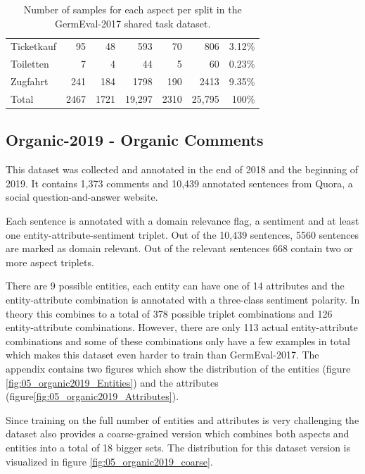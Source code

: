 \begin{table}
\begin{tabular}{lrrrrrr}
		Ticketkauf                   & 95     & 48     & 593    & 70   & 806    & 3.12\%  \\
		Toiletten                    & 7      & 4      & 44     & 5    & 60     & 0.23\%  \\
		Zugfahrt                     & 241    & 184    & 1798   & 190  & 2413   & 9.35\%  \\ 
		\midrule
		Total                        & 2467   & 1721   & 19,297 & 2310 & 25,795 & 100\%   \\ 
		\bottomrule
	\end{tabular}
	\caption{Number of samples for each aspect per split in the GermEval-2017 shared task dataset.}
\label{tab:05_germevalDatasetStats}
\end{table}

\subsection{Organic-2019 - Organic Comments}
\label{sec:05_organic2019}
This dataset was collected and annotated in the end of 2018 and the beginning of 2019. It contains 1,373 comments and 10,439 annotated sentences from Quora, a social question-and-answer website.
\medskip

Each sentence is annotated with a domain relevance flag, a sentiment and at least one entity-attribute-sentiment triplet. Out of the 10,439 sentences, 5560 sentences are marked as domain relevant. Out of the relevant sentences 668 contain two or more aspect triplets.
\medskip

There are 9 possible entities, each entity can have one of 14 attributes and the entity-attribute combination is annotated with a three-class sentiment polarity. In theory this combines to a total of 378 possible triplet combinations and 126 entity-attribute combinations. However, there are only 113 actual entity-attribute combinations and some of these combinations only have a few examples in total which makes this dataset even harder to train than GermEval-2017. The appendix contains two figures which show the distribution of the entities {(figure \ref{fig:05_organic2019_Entities})} and the attributes {(figure\ref{fig:05_organic2019_Attributes})}.
\medskip

Since training on the full number of entities and attributes is very challenging the dataset also provides a coarse-grained version which combines both aspects and entities into a total of 18 bigger sets. The distribution for this dataset version is visualized in figure \ref{fig:05_organic2019_coarse}.

